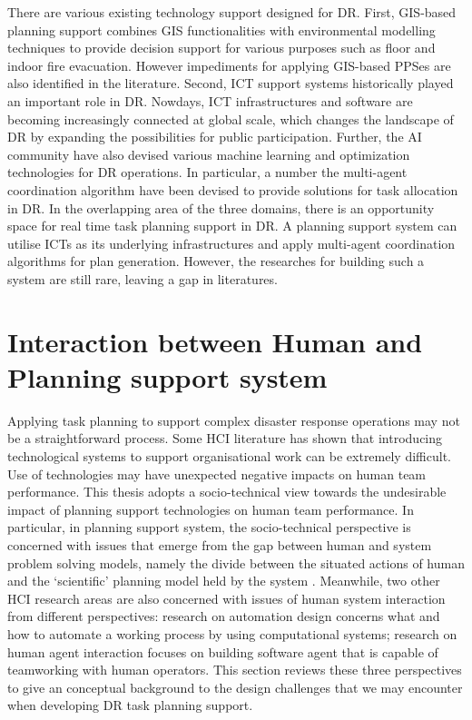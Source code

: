 There are various existing technology support designed for \ac{DR}. First, \ac{GIS}-based planning support combines \ac{GIS} functionalities with environmental modelling techniques to provide decision support for various purposes such as floor and indoor fire evacuation. However impediments for applying \ac{GIS}-based \ac{PPS}es are also identified in the literature. Second, \ac{ICT} support systems historically played an important role in \ac{DR}. Nowdays, \ac{ICT} infrastructures and software are becoming increasingly connected at global scale, which changes the landscape of \ac{DR} by expanding the possibilities for public participation. Further, the \ac{AI} community have also devised various machine learning and optimization technologies for \ac{DR} operations. In particular, a number the multi-agent coordination algorithm have been devised to provide solutions for task allocation in \ac{DR}. In the overlapping area of the three domains, there is an opportunity space for real time task planning support in \ac{DR}. A planning support system can utilise \ac{ICT}s as its underlying infrastructures and apply multi-agent coordination algorithms for plan generation. However, the researches for building such a system are still rare, leaving a gap in literatures.\\

\chapter{Interaction between Human and Planning support system}\label{ch:humanSysRelationship}

Applying task planning to support complex disaster response operations may not be a straightforward process. Some \ac{HCI} literature \citep{Ackerman2000,Bowers1994,Niazkhani2009} has shown that introducing technological systems to support organisational work can be extremely difficult. Use of technologies may have unexpected negative impacts on human team performance. This thesis adopts a socio-technical view towards the undesirable impact of planning support technologies on human team performance. In particular, in planning support system, the socio-technical perspective is concerned with issues that emerge from the gap between human and system problem solving models, namely the divide between the situated actions of human and the `scientific' planning model held by the system \citep{Suchman1987}. Meanwhile, two other \ac{HCI} research areas are also concerned with issues of human system interaction from different perspectives: research on automation design concerns what and how to automate a working process by using computational systems; research on human agent interaction focuses on building software agent that is capable of teamworking with human operators. This section reviews these three perspectives to give an conceptual background to the design challenges that we may encounter when developing \ac{DR} task planning support.\\

